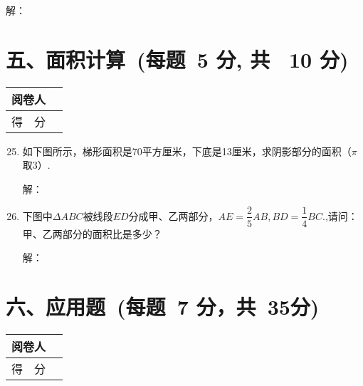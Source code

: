 \documentclass[onecolumn,landscape,UTF8]{ctexart}
\newcommand{\putzdx}{\marginpar{
		\parbox{1cm}{\vspace{-1.6cm}
			\rotatebox[origin=c]{90}{
				\usebox{\zdx}
		}}
}}
\begin{document}
\begin{spacing}{1.3}
\begin{enumerate}
        解：
        \vspace{2.5cm}
\end{enumerate}
\newpage
\section*{\hspace{5cm} 五、面积计算~(每题~5 分, 共~ 10 分)}
\vspace{-1cm}
\begin{tabular}{|p{}|p{}|}
\hline
\centering 阅卷人& \\
\hline
\centering 得~~分 &  \\
\hline
\end{tabular}
		
		\begin{enumerate}\setcounter{enumi}{24}
			\item 如下图所示，梯形面积是70平方厘米，下底是13厘米，求阴影部分的面积（$\pi$取3）.
			
			解：
            \vspace{2.5cm}
			
			\item 下图中$\Delta ABC$被线段$ED$分成甲、乙两部分，$AE=\dfrac{2}{5}AB,BD=\dfrac{1}{4}BC.$,请问：甲、乙两部分的面积比是多少？

           解：
            \vspace{2.5cm}
			

			
		\end{enumerate}
		\newpage
		\putzdx %
		\section*{\hspace{5cm} 六、应用题~(每题~7 分，共~35分)}
		\vspace{-1cm}
		\begin{tabular}{|p{}|p{}|}
			\hline
			\centering  阅卷人& \\
			\hline
			\centering 得~~分 &  \\
			\hline
		\end{tabular}

		\begin{enumerate}\setcounter{enumi}{26}


\end{enumerate}
\end{spacing}
\end{document}
